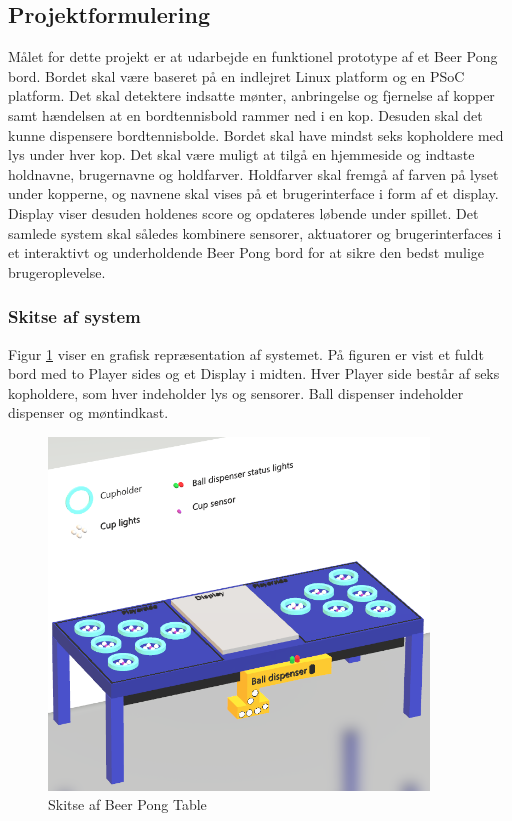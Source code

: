 \documentclass[Rapport/Rapport_main.tex]{subfiles}
\begin{document}
\subsection{Projektformulering}
Målet for dette projekt er at udarbejde en funktionel prototype af et Beer Pong bord. Bordet skal være baseret på en indlejret Linux platform og en PSoC platform. Det skal detektere indsatte mønter, anbringelse og fjernelse af kopper samt hændelsen at en bordtennisbold rammer ned i en kop. Desuden skal det kunne dispensere bordtennisbolde. Bordet skal have mindst seks kopholdere med lys under hver kop. Det skal være muligt at tilgå en hjemmeside og indtaste holdnavne, brugernavne og holdfarver. Holdfarver skal fremgå af farven på lyset under kopperne, og navnene skal vises på et brugerinterface i form af et display. Display viser desuden holdenes score og opdateres løbende under spillet. Det samlede system skal således kombinere sensorer, aktuatorer og brugerinterfaces i et interaktivt og underholdende Beer Pong bord for at sikre den bedst mulige brugeroplevelse.

\subsubsection{Skitse af system}
Figur \ref{fig:system_skitse} viser en grafisk repræsentation af systemet. På figuren er vist et fuldt bord med to Player sides og et Display i midten. Hver Player side består af seks kopholdere, som hver indeholder lys og sensorer. Ball dispenser indeholder dispenser og møntindkast.

\begin{figure}[H]
    \centering
    \includegraphics[width=0.9\textwidth]{Rapport/Indledning/graphics/system_skitse.png}
    \caption{Skitse af Beer Pong Table}
    \label{fig:system_skitse}
\end{figure}
\end{document}
